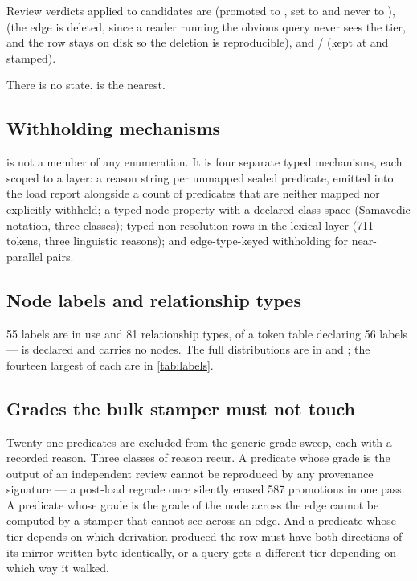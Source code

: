 Review verdicts applied to candidates are  (promoted to
,  set to  and never to
),  (the edge is deleted, since a reader running
the obvious query never sees the tier, and the row stays on disk so the deletion is
reproducible), and  /  (kept at
 and stamped).

There is no  state.  is the nearest.

\subsection{Withholding mechanisms}

 is not a member of any enumeration. It is four separate typed
mechanisms, each scoped to a layer: a reason string per unmapped sealed predicate,
emitted into the load report alongside a count of predicates that are neither mapped
nor explicitly withheld; a typed node property with a declared class space
(S\=amavedic notation, three classes); typed non-resolution rows in the lexical layer
(711 tokens, three linguistic reasons); and edge-type-keyed withholding for
near-parallel pairs.

\subsection{Node labels and relationship types}

55 labels are in use and 81 relationship types, of a token table declaring 56 labels
---  is declared and carries no nodes. The full distributions
are in  and
; the fourteen largest of each
are in \cref{tab:labels}.

\subsection{Grades the bulk stamper must not touch}

Twenty-one predicates are excluded from the generic grade sweep, each with a recorded
reason. Three classes of reason recur. A predicate whose grade is the output of an
independent review cannot be reproduced by any provenance signature --- a post-load
regrade once silently erased 587 promotions in one pass. A predicate whose grade is
the grade of the node across the edge cannot be computed by a stamper that cannot see
across an edge. And a predicate whose tier depends on which derivation produced the
row must have both directions of its mirror written byte-identically, or a query gets
a different tier depending on which way it walked.
